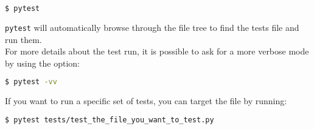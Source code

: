\begin{lstlisting}[language=bash]
  $ pytest
\end{lstlisting}

\lstinline{pytest} will automatically browse through the file tree to find the tests file and run them.\\
For more details about the test run, it is possible to ask for a more verbose mode by using the option:

\begin{lstlisting}[language=bash]
  $ pytest -vv
\end{lstlisting}

If you want to run a specific set of tests, you can target the file by running:

\begin{lstlisting}[language=bash]
  $ pytest tests/test_the_file_you_want_to_test.py
\end{lstlisting}
